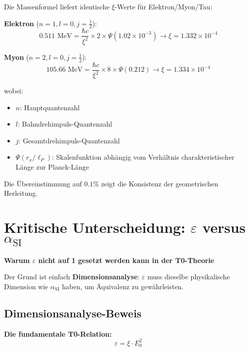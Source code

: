 \documentclass[12pt,a4paper]{article}
\numberwithin{equation}{section}
\newcommand{\xipar}{\xi}
\newcommand{\epsilonT}{\varepsilon}
\newcommand{\alphaSI}{\alpha_{\text{SI}}}
\newcommand{\Eo}{E_0}
\begin{document}
	Die Massenformel liefert identische $\xipar$-Werte für Elektron/Myon/Tau:
	
	\textbf{Elektron} ($n=1, l=0, j=\frac{1}{2}$):
	\begin{equation}
		0.511 \text{ MeV} = \frac{\hbar c}{\xipar^2} \times 2 \times \Psi(1.02 \times 10^{-3}) \rightarrow \xipar = 1.332 \times 10^{-4}
		\label{eq:xi_electron}
	\end{equation}
	
	\textbf{Myon} ($n=2, l=0, j=\frac{1}{2}$):
	\begin{equation}
		105.66 \text{ MeV} = \frac{\hbar c}{\xipar^2} \times 8 \times \Psi(0.212) \rightarrow \xipar = 1.334 \times 10^{-4}
		\label{eq:xi_muon}
	\end{equation}
	
	wobei:
	\begin{itemize}
		\item $n$: Hauptquantenzahl
		\item $l$: Bahndrehimpuls-Quantenzahl
		\item $j$: Gesamtdrehimpuls-Quantenzahl
		\item $\Psi(r_x/\ell_P)$: Skalenfunktion abhängig vom Verhältnis charakteristischer Länge zur Planck-Länge
	\end{itemize}
	
	Die Übereinstimmung auf $0.1\%$ zeigt die Konsistenz der geometrischen Herleitung.
	
	\section{Kritische Unterscheidung: $\epsilonT$ versus $\alphaSI$}
	
	\begin{tcolorbox}[title={\textbf{FUNDAMENTALE KONZEPTUELLE KLARSTELLUNG}},colframe=red,colback=red!5]
		\textbf{Warum $\epsilonT$ nicht auf 1 gesetzt werden kann in der T0-Theorie}
		
		Der Grund ist einfach \textbf{Dimensionsanalyse}: $\epsilonT$ muss dieselbe physikalische Dimension wie $\alphaSI$ haben, um Äquivalenz zu gewährleisten.
	\end{tcolorbox}
	
	\subsection{Dimensionsanalyse-Beweis}
	
	\textbf{Die fundamentale T0-Relation:}
	\begin{equation}
		\epsilonT = \xipar \cdot \Eo^2
		\label{eq:epsilon_fundamental}
	\end{equation}
	
\end{document}
